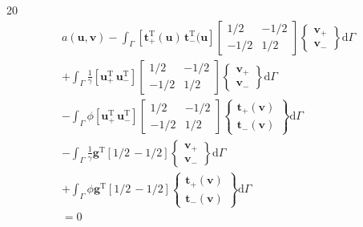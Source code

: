 \documentclass[a4paper,12pt]{article}
\begin{document}
20
\begin{equation}
\begin{split}
a(\mathbf{u},\mathbf{v})
-
\int_\Gamma
[\mathbf{t}_+^\textrm{T}(\mathbf{u})\,\mathbf{t}_-^\textrm{T}(\mathbf{u}]
\left[
\begin{array}{cc}
1/2 & -1/2\\
-1/2 & 1/2
\end{array}
\right]
\left\{
\begin{array}{c}
\mathbf{v}_+ \\ \mathbf{v}_-
\end{array}
\right\}
\textrm{d}\Gamma
\\+
\int_\Gamma
\frac{1}{\gamma}
[ \mathbf{u}_+^\textrm{T}\, \mathbf{u}_-^\textrm{T} ]
\left[
\begin{array}{cc}
1/2 & -1/2\\
-1/2 & 1/2
\end{array}
\right]
\left\{
\begin{array}{c}
\mathbf{v}_+ \\ \mathbf{v}_-
\end{array}
\right\}
\textrm{d}\Gamma
\\-
\int_\Gamma
\phi
[\mathbf{u}_+^\textrm{T}\, \mathbf{u}_-^\textrm{T}]
\left[
\begin{array}{cc}
1/2 & -1/2\\
-1/2 & 1/2
\end{array}
\right]
\left\{
\begin{array}{c}
\mathbf{t}_+(\mathbf{v})\\ \mathbf{t}_-(\mathbf{v})
\end{array}
\right\}
\textrm{d}\Gamma
\\-
\int_\Gamma
\frac{1}{\gamma}
\mathbf{g}^\textrm{T}
[ 1/2\, -1/2]
\left\{
\begin{array}{c}
\mathbf{v}_+ \\ \mathbf{v}_-
\end{array}
\right\}
\textrm{d}\Gamma
\\+
\int_\Gamma
\phi\mathbf{g}^\textrm{T}
[ 1/2\, -1/2]
\left\{
\begin{array}{c}
\mathbf{t}_+(\mathbf{v})\\ \mathbf{t}_-(\mathbf{v})
\end{array}
\right\}
\textrm{d}\Gamma
\\=
0
\end{split}
\end{equation}
\end{document}
